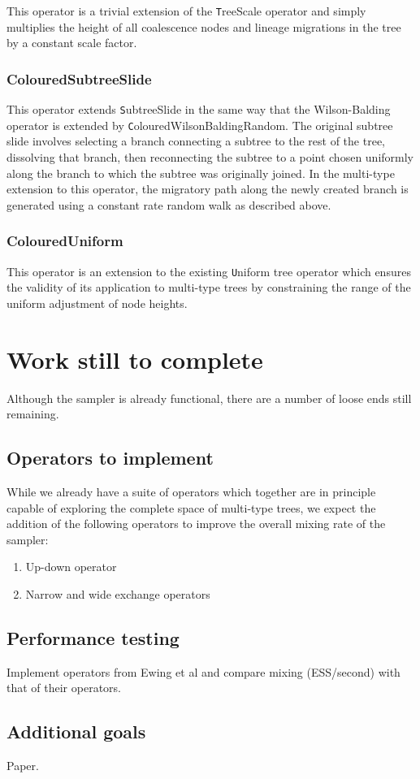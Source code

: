 \documentclass[a4paper,11pt]{article}
\newcommand{\class}[1]{{\texttt #1}}
\begin{document}
This operator is a trivial extension of the \class{TreeScale} operator
and simply multiplies the height of all coalescence nodes and lineage
migrations in the tree by a constant scale factor.

\subsubsection{ColouredSubtreeSlide}

This operator extends \class{SubtreeSlide} in the same way that the
Wilson-Balding operator is extended by
\class{ColouredWilsonBaldingRandom}.  The original subtree slide
involves selecting a branch connecting a subtree to the rest of the
tree, dissolving that branch, then reconnecting the subtree to a point chosen
uniformly along the branch to which the subtree was originally joined.  In the
multi-type extension to this operator, the migratory path along the
newly created branch is generated using a constant rate random walk as
described above.

\subsubsection{ColouredUniform}

This operator is an extension to the existing \class{Uniform} tree
operator which ensures the validity of its application to multi-type
trees by constraining the range of the uniform adjustment of node
heights. 

\section{Work still to complete}

Although the sampler is already functional, there are a number of loose ends
still remaining.

\subsection{Operators to implement}

While we already have a suite of operators which together are in
principle capable of exploring the complete space of multi-type trees,
we expect the addition of the following operators to improve the
overall mixing rate of the sampler:
\begin{enumerate}
\item Up-down operator
\item Narrow and wide exchange operators
\end{enumerate}

\subsection{Performance testing}

Implement operators from Ewing et al and compare mixing (ESS/second)
with that of their operators.

\subsection{Additional goals}

Paper.



\end{document}
